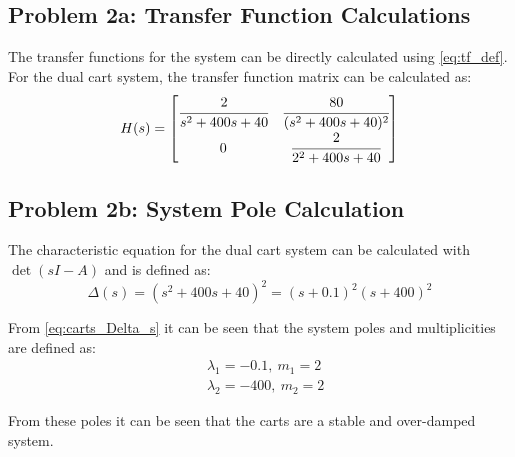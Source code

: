 \documentclass[]{article}
\begin{document}
	\subsection{Problem 2a: Transfer Function Calculations}
		The transfer functions for the system can be directly calculated using \eqref{eq:tf_def}. For the dual cart system, the transfer function matrix can be calculated as:
		\begin{equation}
			H(s) = \mqty[	\cfrac{2}{s^2+400s+40}	&\cfrac{80}{(s^2+400s+40)^2}\\
							0						&\cfrac{2}{2^2+400s+40}
							]
		\end{equation}
	
	\subsection{Problem 2b: System Pole Calculation}
		The characteristic equation for the dual cart system can be calculated with $\det(sI-A)$ and is defined as:
		\begin{equation}
			\Delta (s) = (s^2 + 400s +40)^2 = (s+0.1)^2(s+400)^2
			\label{eq:carts_Delta_s}
		\end{equation}
		
		From \eqref{eq:carts_Delta_s} it can be seen that the system poles and multiplicities are defined as:
		\begin{equation}
			\begin{aligned}
				&\lambda_1 = -0.1, \ m_1 = 2\\
				&\lambda_2 = -400, \ m_2 = 2
			\end{aligned}
		\end{equation}
	
		From these poles it can be seen that the carts are a stable and over-damped system.
		
\end{document}
